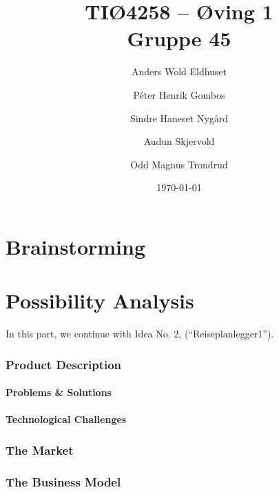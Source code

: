 \documentclass[a4paper]{article}
\title{TIØ4258 -- Øving 1 \\ Gruppe 45}
\author{
    Anders Wold Eldhuset \and
    Péter Henrik Gombos \and
    Sindre Haneset Nygård \and
    Audun Skjervold \and
    Odd Magnus Trondrud
}
\date{\today}
\begin{document}
    \maketitle
    \setcounter{secnumdepth}{2}

    \part{Brainstorming}
    	

    \part{Possibility Analysis}
    	In this part, we continue with Idea No. 2, (``Reiseplanlegger1'').
    	\section{Product Description}
    		\subsection{Problems & Solutions}
	    		
    		\subsection{Technological Challenges}
	    			
	    \section{The Market} %

	    \section{The Business Model}
\end{document}
